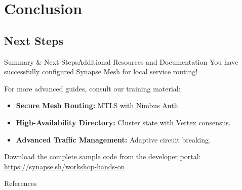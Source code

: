 \section{Conclusion}
\subsection{Next Steps}

\begin{frame}{Summary \& Next Steps}{Additional Resources and Documentation}
  You have successfully configured Synapse Mesh for local service routing!
  
  \vspace{0.3cm}
  For more advanced guides, consult our training material:
  \begin{itemize}
    \item \textbf{Secure Mesh Routing:} MTLS with Nimbus Auth.
    \item \textbf{High-Availability Directory:} Cluster state with Vertex consensus.
    \item \textbf{Advanced Traffic Management:} Adaptive circuit breaking.
  \end{itemize}
  
  \vspace{0.4cm}
  Download the complete sample code from the developer portal:
  \url{https://synapse.sh/workshop-hands-on}
\end{frame}

\begin{frame}[allowframebreaks]{References}
  \printbibliography
\end{frame}
